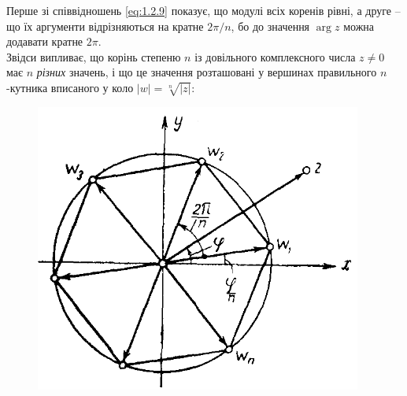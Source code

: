Перше зі співвідношень \eqref{eq:1.2.9} показує, що модулі всіх коренів рівні, а друге -- що їх аргументи відрізняються на кратне $2 \pi / n$, бо до значення $\arg z$ можна додавати кратне $2 \pi$. \\

Звідси випливає, що корінь степеню $n$ із довільного комплексного числа $z \ne 0$ має $n$ \textit{різних} значень, і що це значення розташовані у вершинах правильного $n$-кутника вписаного у коло $|w| = \sqrt[n]{|z|}$:
\begin{figure}[H]
	\centering
	\includegraphics[width=.45\linewidth]{mal-04.png}
	\label{fig:4}
\end{figure}


% 